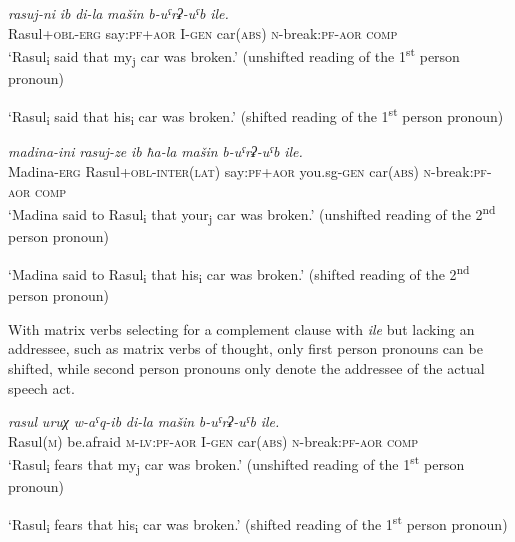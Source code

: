 ﻿\documentclass[output=paper]{langsci/langscibook}
\begin{document}
\ea %
\gll \emph{rasuj-ni} \emph{ib} \emph{di-la} \emph{mašin} \emph{b-uˤrʡ-uˤb} \emph{ile.}\\
Rasul+\textsc{obl}-\textsc{erg} say:\textsc{pf}+\textsc{aor} I-\textsc{gen} car(\textsc{abs}) \textsc{n}-break:\textsc{pf}-\textsc{aor} \textsc{comp}\\

\ea %
`Rasul\textsubscript{i} said that my\textsubscript{j} car was broken.' (unshifted reading of the 1\textsuperscript{st} person pronoun)

\ex %
`Rasul\textsubscript{i} said that his\textsubscript{i} car was broken.' (shifted reading of the 1\textsuperscript{st} person pronoun)
\z

\ex %
\gll \emph{madina-ini} \emph{rasuj-ze} \emph{ib} \emph{ħa-la} \emph{mašin} \emph{b-uˤrʡ-uˤb} \emph{ile.}\\
Madina-\textsc{erg} Rasul+\textsc{obl}-\textsc{inter(lat)} say:\textsc{pf}+\textsc{aor} you.sg-\textsc{gen} car(\textsc{abs}) \textsc{n}-break:\textsc{pf}-\textsc{aor} \textsc{comp}\\

\ea %
`Madina said to Rasul\textsubscript{i} that your\textsubscript{j} car
was broken.' (unshifted reading of the 2\textsuperscript{nd} person
pronoun)

\ex %
`Madina said to Rasul\textsubscript{i} that his\textsubscript{i} car
was broken.' (shifted reading of the 2\textsuperscript{nd} person
pronoun)
\z
\z

With matrix verbs selecting for a complement clause with \emph{ile} but
lacking an addressee, such as matrix verbs of thought, only first person
pronouns can be shifted, while second person pronouns only denote the
addressee of the actual speech act.

\ea %
\gll \emph{rasul} \emph{uruχ} \emph{w-aˤq-ib} \emph{di-la} \emph{mašin} \emph{b-uˤrʡ-uˤb} \emph{ile.}\\
Rasul(\textsc{m}) be.afraid \textsc{m}-\textsc{lv}:\textsc{pf}-\textsc{aor} I-\textsc{gen} car(\textsc{abs}) \textsc{n}-break:\textsc{pf}-\textsc{aor} \textsc{comp}\\

\ea %
`Rasul\textsubscript{i} fears that my\textsubscript{j} car was
broken.' (unshifted reading of the 1\textsuperscript{st} person pronoun)

\ex %
`Rasul\textsubscript{i} fears that his\textsubscript{i} car was broken.' (shifted reading of the 1\textsuperscript{st} person pronoun)
\z
\end{document}
